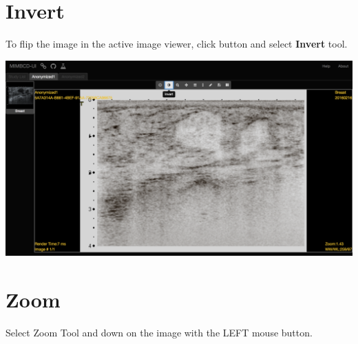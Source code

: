 \documentclass{tufte-book} %
\begin{document}
\begin{enumerate}
\hfill

\end{enumerate}

\chapter{Invert}

To flip the image in the active image viewer, click button and select \textbf{Invert} tool.

\hfill

\begin{center}
\includegraphics[width=\textwidth]{graphics/anon1_invert.png}
\end{center}

\hfill

\chapter{Zoom}

Select Zoom Tool and down on the image with the LEFT mouse button.
\end{document}
